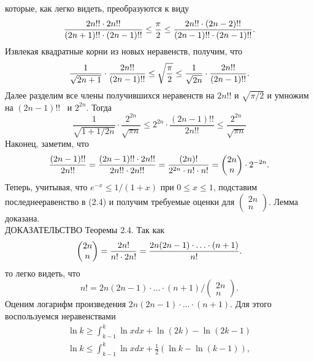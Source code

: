 \documentclass[12pt]{article}
\begin{document}
которые, как легко видеть, преобразуются к виду
\begin{equation}
    \frac{2n!!\cdot2n!!}{(2n+1)!!\cdot(2n-1)!!}\le \frac{\pi}{2} \le  \frac{2n!!\cdot(2n-2)!!}{(2n-1)!!\cdot(2n-1)!!}.\\  \notag
\end{equation}
Извлекая квадратные корни из новых неравенств, получим, что
\begin{equation}
    \frac{1}{\sqrt{2n+1}}\cdot \frac{2n!!}{(2n-1)!!}\le \sqrt{\frac{\pi}{2}}\le \frac{1}{\sqrt{2n}}\cdot \frac{2n!!}{(2n-1)!!}.  \notag
\end{equation}
Далее разделим все члены получившихся неравенств на $2n!!$ и $\sqrt{\pi/2}$ и умножим на $(2n-1)!!$ ~и $2^{2n}$. Тогда
\begin{equation}
     \frac{1}{\sqrt{1+1/2n}}\cdot \frac{2^{2n}}{\sqrt{\pi n}}\le 2^{2n}\cdot \frac{(2n-1)!!}{2n!!}\le \frac{2^{2n}}{\sqrt{\pi n}}
\end{equation}
Наконец, заметим, что
\begin{equation}
    \frac{(2n-1)!!}{2n!!}=\frac{(2n-1)!!\cdot 2n!!}{2n!!\cdot 2n!!}=\frac{(2n)!}{2^{2n}\cdot n!\cdot n!}=\begin{pmatrix} 2n\\n \end{pmatrix}\cdot 2^{-2n}.  \notag
\end{equation}
Теперь, учитывая, что $e^{-x}\le 1/(1+x)\text{ при } 0\le x\le 1$, подставим последнееравенство в (2.4) и получим требуемые оценки для $\begin{pmatrix} 2n\\n \end{pmatrix}$. Лемма доказана.\\
ДОКАЗАТЕЛЬСТВО Теоремы 2.4. Так как
\begin{equation}
    \begin{pmatrix} 2n\\n \end{pmatrix}=\frac{2n!}{n!\cdot2n!}=\frac{2n(2n-1)\cdot \ldots \cdot(n+1)}{n!}.  \notag
\end{equation}
то легко видеть, что
\begin{equation}
    n!=2n(2n-1)\cdot \ldots \cdot(n+1)\bigg/\begin{pmatrix} 2n\\n \end{pmatrix}.
\end{equation}
Оценим логарифм произведения $2n(2n- 1)\cdot \ldots \cdot (n+1)$. Для этого воспользуемся неравенствами
\begin{align}
    \ln{k}\ge\int_{k-1}^k{\ln{x d x}+\ln{(2k)}-\ln{(2k-1)}} \label{fm}\\
    \ln{k}\le\int_{k-1}^k{\ln{x d x}+\frac{1}{2} \left(\ln{k}-\ln{(k-1)}\right)},\label{fm2}
\end{align}
\end{document}
